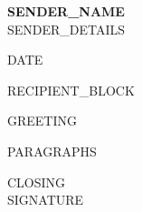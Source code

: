 \documentclass[11pt]{article}
\begin{document}
{\LARGE \textbf{{{SENDER_NAME}}}}\\[0.4em]
{{SENDER_DETAILS}}

\vspace{1.5em}

{{DATE}}

\vspace{1.5em}

{{RECIPIENT_BLOCK}}

\vspace{1.5em}

{{GREETING}}

\vspace{1em}

{{PARAGRAPHS}}

\vspace{1.5em}

{{CLOSING}}\\[1.2em]
{{SIGNATURE}}
\end{document}

